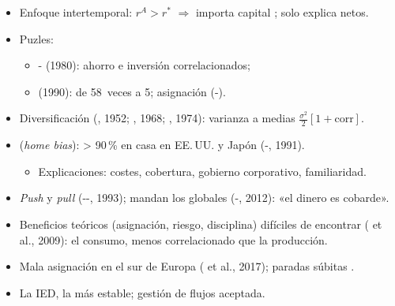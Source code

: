 \documentclass{article}
\begin{document}
\begin{columnas}
\begin{itemize}
\item Enfoque intertemporal: $r^A>r^*$ $\Rightarrow$ importa capital ; solo explica netos.
\item Puzles:
  \begin{itemize}
  \item {}- (1980): ahorro e inversión correlacionados;
  \item {} (1990): de 58~veces a 5; asignación (-).
  \end{itemize}
\end{itemize}
\begin{itemize}
\item Diversificación (, 1952; , 1968; , 1974): varianza a medias $\tfrac{\sigma^2}{2}[1+\mathrm{corr}]$.
\item {} (\emph{home bias}): > 90\,\% en casa en EE.\,UU. y Japón (-, 1991).
  \begin{itemize}
  \item Explicaciones: costes, cobertura, gobierno corporativo, familiaridad.
  \end{itemize}
\end{itemize}
\begin{itemize}
\item \emph{Push} y \emph{pull} (--, 1993); mandan los globales (-, 2012): «el dinero es cobarde».
\end{itemize}
\begin{itemize}
\item Beneficios teóricos (asignación, riesgo, disciplina) difíciles de encontrar ( et al., 2009): el consumo, menos correlacionado que la producción.
\item Mala asignación en el sur de Europa ( et al., 2017); paradas súbitas .
\item La IED, la más estable; gestión de flujos aceptada.
\end{itemize}


\end{columnas}
\end{document}
